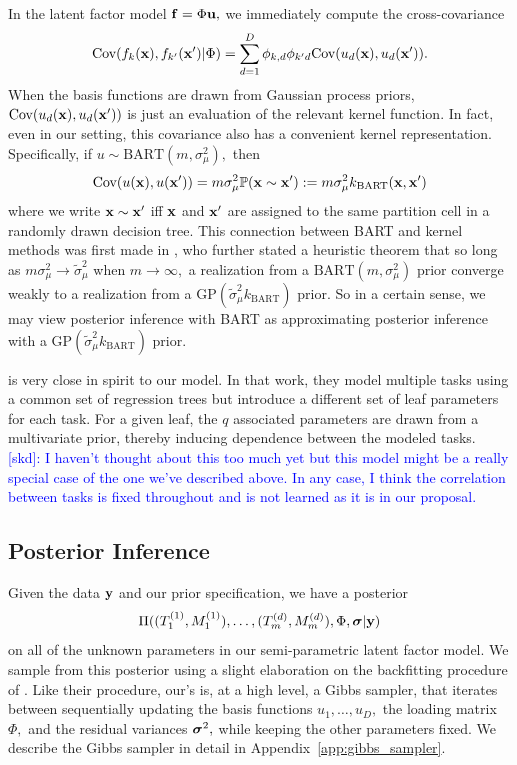 \documentclass[12pt]{article}
\begin{document}
In the latent factor model $\mathbf{f} = \Phi \mathbf{u},$ we immediately compute the cross-covariance
$$
\text{Cov}(f_{k}(\mathbf{x}), f_{k'}(\mathbf{x}') | \Phi) = \sum_{d = 1}^{D}{\phi_{k,d}\phi_{k'd}\text{Cov}(u_{d}(\mathbf{x}), u_{d}(\mathbf{x}'))}.
$$
When the basis functions are drawn from Gaussian process priors, $\text{Cov}(u_{d}(\mathbf{x}), u_{d}(\mathbf{x}'))$ is just an evaluation of the relevant kernel function.
In fact, even in our setting, this covariance also has a convenient kernel representation.
Specifically, if $u \sim \text{BART}(m, \sigma^{2}_{\mu}),$ then 
$$
\text{Cov}(u(\mathbf{x}), u(\mathbf{x}')) = m\sigma^{2}_{\mu}\mathbb{P}(\mathbf{x} \sim \mathbf{x}') := m\sigma^{2}_{\mu}k_{\text{BART}}(\mathbf{x}, \mathbf{x}')
$$
where we write $\mathbf{x} \sim \mathbf{x}'$ iff $\mathbf{x}$ and $\mathbf{x}'$ are assigned to the same partition cell in a randomly drawn decision tree. 
This connection between BART and kernel methods was first made in \citet{Linero2017}, who further stated a heuristic theorem that so long as $m\sigma^{2}_{\mu} \rightarrow \tilde{\sigma}^{2}_{\mu}$ when $m \rightarrow \infty,$ a realization from a $\text{BART}(m,\sigma^{2}_{\mu})$ prior converge weakly to a realization from a $\text{GP}(\tilde{\sigma}^{2}_{\mu}k_{\text{BART}})$ prior.
So in a certain sense, we may view posterior inference with BART as approximating posterior inference with a $\text{GP}(\tilde{\sigma}^{2}_{\mu}k_{\text{BART}})$ prior.

\citet{Linero2018} is very close in spirit to our model.
In that work, they model multiple tasks using a common set of regression trees but introduce a different set of leaf parameters for each task.
For a given leaf, the $q$ associated parameters are drawn from a multivariate prior, thereby inducing dependence between the modeled tasks.
\textcolor{blue}{[skd]: I haven't thought about this too much yet but this model might be a really special case of the one we've described above. In any case, I think the correlation between tasks is fixed throughout and is not learned as it is in our proposal.}


\subsection{Posterior Inference}
Given the data $\mathbf{y}$ and our prior specification, we have a posterior 
$$
\Pi( (T_{1}^{(1)}, M_{1}^{(1)}), \ldots, (T^{(d)}_{m}, M^{(d)}_{m}), \Phi, \boldsymbol{\sigma} | \mathbf{y})
$$
on all of the unknown parameters in our semi-parametric latent factor model. 
We sample from this posterior using a slight elaboration on the backfitting procedure of \citet{Chipman2010}.
Like their procedure, our's is, at a high level, a Gibbs sampler, that iterates between sequentially updating the basis functions $u_{1}, \ldots, u_{D},$ the loading matrix $\Phi,$ and the residual variances $\boldsymbol{\sigma}^{2},$ while keeping the other parameters fixed.
We describe the Gibbs sampler in detail in Appendix~\ref{app:gibbs_sampler}.
\end{document}
